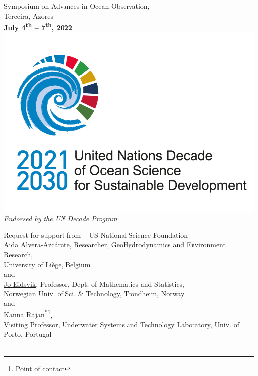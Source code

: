 
\begin{titlepage}

  \begin{center}
\Large{Symposium on Advances in Ocean Observation,\\
  Terceira, Azores\\
  \large{\textbf{July 4\textsuperscript{th} -- 7\textsuperscript{th},
      2022}}\\
}
\vspace{+1cm}
\hspace{+0.5cm}\href{https://www.oceandecade.org/}{\includegraphics[scale=0.5]{fig/un-decade.png}}\\
\small{\emph{Endorsed by the UN Decade Program}}
\vspace{+2.5cm}

  \large{Request for support from \nsf -- US National Science Foundation}\\
\vspace{+2.9in}
  \small{
    \href{http://modb.oce.ulg.ac.be/mediawiki/index.php/User:Aida}{\textsf{Aida Alvera-Azc\'{a}rate}},
    Researcher, GeoHydrodynamics and Environment Research,\\
    University of Li\`{e}ge, Belgium\\
    and\\
    \href{https://www.ntnu.edu/employees/jo.eidsvik}{\textsf{Jo Eidsvik}},
    Professor, Dept. of Mathematics and Statistics, \\Norwegian Univ. of
    Sci. \& Technology, Trondheim, Norway\\
    and\\
    \href{https://kanna.rajan.systems}{\textsf{Kanna
        Rajan\textsuperscript{*}}\footnote{Point of contact}},\\
    Visiting Professor, Underwater Systems and Technology
    Laboratory, Univ. of Porto, Portugal\\
    \\
  }
\end{center}
\end{titlepage}
